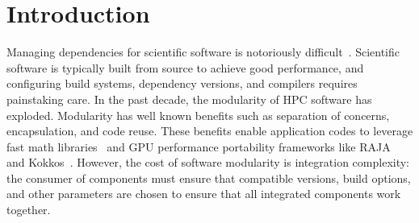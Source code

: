 \section{Introduction}
\label{sec:intro}




Managing dependencies for scientific software is notoriously
difficult~\cite{hoste+:pyhpc12,gamblin+:sc15,dubois2003johnny,hochstein+:2011-build}.
Scientific software is typically built from source to achieve good performance, and
configuring build systems, dependency versions, and compilers requires painstaking care.
In the past decade, the modularity of HPC software has exploded. Modularity has well
known benefits such as separation of concerns, encapsulation, and code reuse. These
benefits enable application codes to leverage fast math
libraries~\cite{hypre,mfem,petsc,trilinos} and GPU performance portability frameworks
like RAJA~\cite{raja} and Kokkos~\cite{kokkos}. However, the cost of software modularity
is integration complexity: the consumer of components must ensure that compatible
versions, build options, and other parameters are chosen to ensure that all integrated
components work together.


